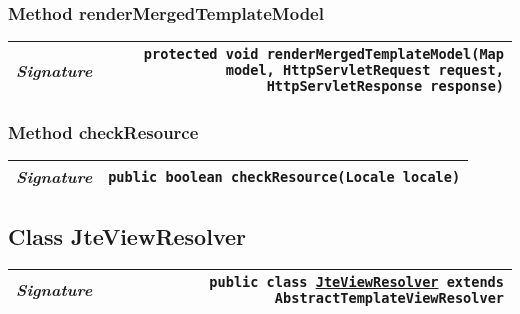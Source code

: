 \begin{adjustwidth}{1.5em}{0pt}
\begin{adjustwidth}{1.5em}{0pt}
\begin{adjustwidth}{1.5em}{0pt}
{\begin{tabularx}{1.0\linewidth}{@{}l R@{}}
      \end{tabularx}}
    \end{adjustwidth}\subsubsection{Method renderMergedTemplateModel\label{edu.kit.hci.soli.config.template.JteView@renderMergedTemplateModel(java.util.Map,jakarta.servlet.http.HttpServletRequest,jakarta.servlet.http.HttpServletResponse)}}
    \begin{adjustwidth}{1.5em}{0pt}
      {\begin{tabularx}{1.0\linewidth}{@{}l R@{}}
        \emph{Signature} & \texttt{protected \texttt{void} renderMergedTemplateModel(\texttt{Map} model, \texttt{HttpServletRequest} request, \texttt{HttpServletResponse} response)} \\
        \hline
  
      \end{tabularx}}
    \end{adjustwidth}\subsubsection{Method checkResource\label{edu.kit.hci.soli.config.template.JteView@checkResource(java.util.Locale)}}
    \begin{adjustwidth}{1.5em}{0pt}
      {\begin{tabularx}{1.0\linewidth}{@{}l R@{}}
        \emph{Signature} & \texttt{public \texttt{boolean} checkResource(\texttt{Locale} locale)} \\
        \hline
  
      \end{tabularx}}
    \end{adjustwidth}
  \end{adjustwidth}\subsection{Class JteViewResolver\label{edu.kit.hci.soli.config.template.JteViewResolver} }
  \begin{adjustwidth}{1.5em}{0pt}
    {\begin{tabularx}{1.0\linewidth}{@{}l R@{}}
      \emph{Signature} & \texttt{public  class \texttt{\hyperref[edu.kit.hci.soli.config.template.JteViewResolver]{\texttt{JteViewResolver}} extends \texttt{AbstractTemplateViewResolver}}} \\
      \hline
  

\end{tabularx}}
\end{adjustwidth}
\end{adjustwidth}
